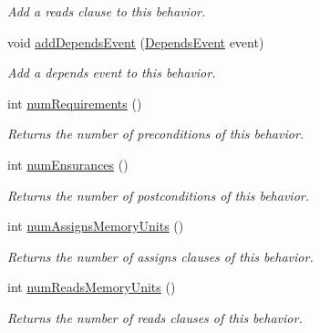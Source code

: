 \begin{DoxyCompactItemize}
\begin{DoxyCompactList}\small\item\em Add a reads clause to this behavior. \end{DoxyCompactList}\item 
void \hyperlink{classedu_1_1udel_1_1cis_1_1vsl_1_1civl_1_1model_1_1common_1_1contract_1_1CommonFunctionBehavior_a9a53082a157dd7d394269e90ea1eb101}{add\+Depends\+Event} (\hyperlink{interfaceedu_1_1udel_1_1cis_1_1vsl_1_1civl_1_1model_1_1IF_1_1contract_1_1DependsEvent}{Depends\+Event} event)
\begin{DoxyCompactList}\small\item\em Add a depends event to this behavior. \end{DoxyCompactList}\item 
int \hyperlink{classedu_1_1udel_1_1cis_1_1vsl_1_1civl_1_1model_1_1common_1_1contract_1_1CommonFunctionBehavior_aa1ff7490751a66b62103397055b82e0a}{num\+Requirements} ()
\begin{DoxyCompactList}\small\item\em Returns the number of preconditions of this behavior. \end{DoxyCompactList}\item 
int \hyperlink{classedu_1_1udel_1_1cis_1_1vsl_1_1civl_1_1model_1_1common_1_1contract_1_1CommonFunctionBehavior_aa287c25a5f400f3afd29e1b5ca522445}{num\+Ensurances} ()
\begin{DoxyCompactList}\small\item\em Returns the number of postconditions of this behavior. \end{DoxyCompactList}\item 
int \hyperlink{classedu_1_1udel_1_1cis_1_1vsl_1_1civl_1_1model_1_1common_1_1contract_1_1CommonFunctionBehavior_a59a08d96bd3dfa3eb4eec8c4500bbc0a}{num\+Assigns\+Memory\+Units} ()
\begin{DoxyCompactList}\small\item\em Returns the number of assigns clauses of this behavior. \end{DoxyCompactList}\item 
int \hyperlink{classedu_1_1udel_1_1cis_1_1vsl_1_1civl_1_1model_1_1common_1_1contract_1_1CommonFunctionBehavior_adc82ec1e41c44cf0a8ddf98560d863db}{num\+Reads\+Memory\+Units} ()
\begin{DoxyCompactList}\small\item\em Returns the number of reads clauses of this behavior. \end{DoxyCompactList}\item 

\end{DoxyCompactItemize}
